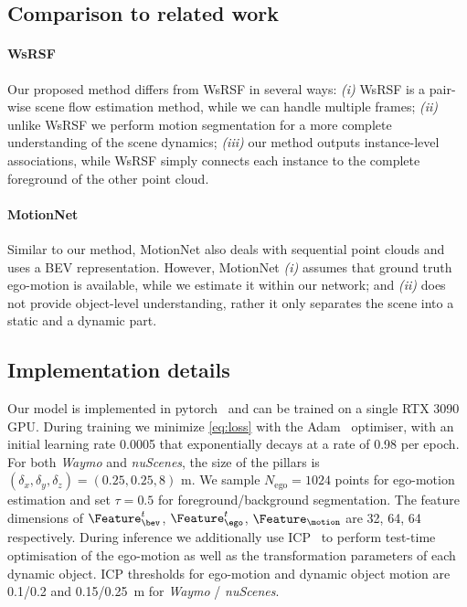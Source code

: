 \subsection{Comparison to related work}
\paragraph{WsRSF~\cite{gojcic2021weakly}} Our proposed method differs from WsRSF in several ways: \textit{(i)} WsRSF is a pair-wise scene flow estimation method, while we can handle multiple frames; \textit{(ii)} unlike WsRSF we perform motion segmentation for a more complete understanding of the scene dynamics; \textit{(iii)} our method outputs instance-level associations, while WsRSF simply connects each instance to the complete foreground of the other point cloud.

\paragraph{MotionNet~\cite{wu2020motionnet}} Similar to our method, MotionNet also deals with sequential point clouds and uses a BEV representation. However, MotionNet \textit{(i)} assumes that ground truth ego-motion is available, while we estimate it within our network; and \textit{(ii)} does not provide object-level understanding, rather it only separates the scene into a static and a dynamic part. 

\subsection{Implementation details}
Our model is implemented in pytorch~\cite{NEURIPS2019_9015} and can be trained on a single RTX 3090 GPU. During training we minimize \cref{eq:loss} with the Adam~\cite{kingma2014adam} optimiser, with an initial learning rate 0.0005 that exponentially decays at a rate of 0.98 per epoch. For both \emph{Waymo} and \emph{nuScenes}, the size of the pillars is $(\delta_x, \delta_y, \delta_z) = (0.25, 0.25, 8)$ m. We sample $N_{\text{ego}} = 1024$ points for ego-motion estimation and set $\tau =0.5$ for foreground/background segmentation. The feature dimensions of $\Feature_\bev^t$, $\Feature_\ego^t$, $\Feature_\motion$ are 32, 64, 64 respectively. During inference we additionally use ICP~\cite{besl1992method} to perform test-time optimisation of the ego-motion as well as the transformation parameters of each dynamic object. ICP thresholds for ego-motion and dynamic object motion are 0.1/0.2 and 0.15/0.25 $\,$m for \emph{Waymo} / \emph{nuScenes}. 




